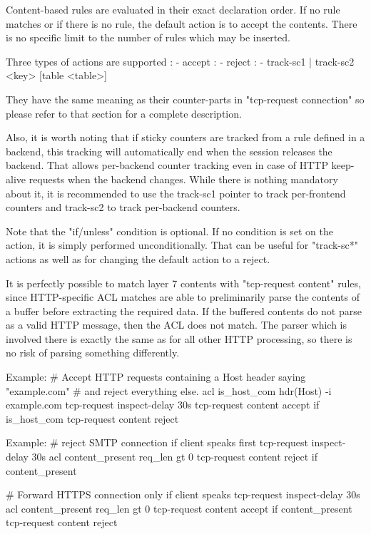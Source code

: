   Content-based rules are evaluated in their exact declaration order. If no
  rule matches or if there is no rule, the default action is to accept the
  contents. There is no specific limit to the number of rules which may be
  inserted.

  Three types of actions are supported :
    - accept :
    - reject :
    - { track-sc1 | track-sc2 } <key> [table <table>]

  They have the same meaning as their counter-parts in "tcp-request connection"
  so please refer to that section for a complete description.

  Also, it is worth noting that if sticky counters are tracked from a rule
  defined in a backend, this tracking will automatically end when the session
  releases the backend. That allows per-backend counter tracking even in case
  of HTTP keep-alive requests when the backend changes. While there is nothing
  mandatory about it, it is recommended to use the track-sc1 pointer to track
  per-frontend counters and track-sc2 to track per-backend counters.

  Note that the "if/unless" condition is optional. If no condition is set on
  the action, it is simply performed unconditionally. That can be useful for
  "track-sc*" actions as well as for changing the default action to a reject.

  It is perfectly possible to match layer 7 contents with "tcp-request content"
  rules, since HTTP-specific ACL matches are able to preliminarily parse the
  contents of a buffer before extracting the required data. If the buffered
  contents do not parse as a valid HTTP message, then the ACL does not match.
  The parser which is involved there is exactly the same as for all other HTTP
  processing, so there is no risk of parsing something differently.

  Example:
        # Accept HTTP requests containing a Host header saying "example.com"
        # and reject everything else.
        acl is_host_com hdr(Host) -i example.com
        tcp-request inspect-delay 30s
        tcp-request content accept if is_host_com
        tcp-request content reject

  Example:
        # reject SMTP connection if client speaks first
        tcp-request inspect-delay 30s
        acl content_present req_len gt 0
        tcp-request content reject if content_present

        # Forward HTTPS connection only if client speaks
        tcp-request inspect-delay 30s
        acl content_present req_len gt 0
        tcp-request content accept if content_present
        tcp-request content reject

